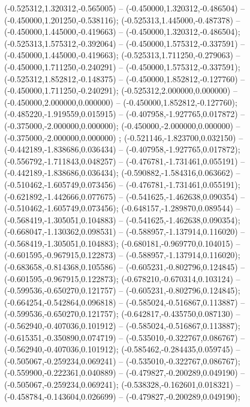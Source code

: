  (-0.525312,1.320312,-0.565005) -- (-0.450000,1.320312,-0.486504) -- (-0.450000,1.201250,-0.538116);
 (-0.525313,1.445000,-0.487378) -- (-0.450000,1.445000,-0.419663) -- (-0.450000,1.320312,-0.486504);
 (-0.525313,1.575312,-0.392064) -- (-0.450000,1.575312,-0.337591) -- (-0.450000,1.445000,-0.419663);
 (-0.525313,1.711250,-0.279063) -- (-0.450000,1.711250,-0.240291) -- (-0.450000,1.575312,-0.337591);
 (-0.525312,1.852812,-0.148375) -- (-0.450000,1.852812,-0.127760) -- (-0.450000,1.711250,-0.240291);
 (-0.525312,2.000000,0.000000) -- (-0.450000,2.000000,0.000000) -- (-0.450000,1.852812,-0.127760);
 (-0.485220,-1.919559,0.015915) -- (-0.407958,-1.927765,0.017872) -- (-0.375000,-2.000000,0.000000);
 (-0.450000,-2.000000,0.000000) -- (-0.375000,-2.000000,0.000000) ;
 (-0.521146,-1.823700,0.032150) -- (-0.442189,-1.838686,0.036434) -- (-0.407958,-1.927765,0.017872);
 (-0.556792,-1.711843,0.048257) -- (-0.476781,-1.731461,0.055191) -- (-0.442189,-1.838686,0.036434);
 (-0.590882,-1.584316,0.063662) -- (-0.510462,-1.605749,0.073456) -- (-0.476781,-1.731461,0.055191);
 (-0.621892,-1.442666,0.077675) -- (-0.541625,-1.462638,0.090354) -- (-0.510462,-1.605749,0.073456);
 (-0.648157,-1.289870,0.089544) -- (-0.568419,-1.305051,0.104883) -- (-0.541625,-1.462638,0.090354);
 (-0.668047,-1.130362,0.098531) -- (-0.588957,-1.137914,0.116020) -- (-0.568419,-1.305051,0.104883);
 (-0.680181,-0.969770,0.104015) -- (-0.601595,-0.967915,0.122873) -- (-0.588957,-1.137914,0.116020);
 (-0.683658,-0.814368,0.105586) -- (-0.605231,-0.802796,0.124845) -- (-0.601595,-0.967915,0.122873);
 (-0.678210,-0.670314,0.103124) -- (-0.599536,-0.650270,0.121757) -- (-0.605231,-0.802796,0.124845);
 (-0.664254,-0.542864,0.096818) -- (-0.585024,-0.516867,0.113887) -- (-0.599536,-0.650270,0.121757);
 (-0.642817,-0.435750,0.087130) -- (-0.562940,-0.407036,0.101912) -- (-0.585024,-0.516867,0.113887);
 (-0.615351,-0.350890,0.074719) -- (-0.535010,-0.322767,0.086767) -- (-0.562940,-0.407036,0.101912);
 (-0.585462,-0.284435,0.059745) -- (-0.505067,-0.259234,0.069241) -- (-0.535010,-0.322767,0.086767);
 (-0.559900,-0.222361,0.040889) -- (-0.479827,-0.200289,0.049190) -- (-0.505067,-0.259234,0.069241);
 (-0.538328,-0.162601,0.018321) -- (-0.458784,-0.143604,0.026699) -- (-0.479827,-0.200289,0.049190);
